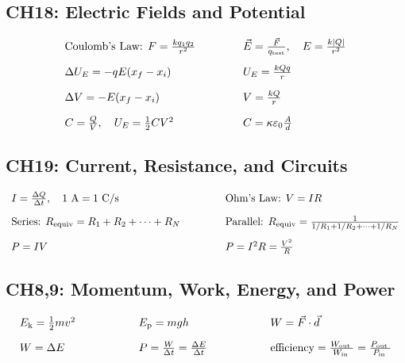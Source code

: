 \documentclass[12pt,a4paper]{article}
\begin{document}
\subsection{CH18: Electric Fields and Potential}
\begin{align*}
\begin{array}{l@{\hspace{1.5cm}}l}
\text{Coulomb's Law: } F = \frac{k q_1 q_2}{r^2} & \vec{E} = \frac{\vec{F}}{q_{\text{test}}}, \quad E = \frac{k|Q|}{r^2} \\[1em]
\Delta U_E = -qE(x_f - x_i) & U_E = \frac{kQq}{r} \\[1em]
\Delta V = -E(x_f - x_i) & V = \frac{kQ}{r} \\[1em]
C = \frac{Q}{V}, \quad U_E = \frac{1}{2}CV^2 & C = \kappa\varepsilon_0\frac{A}{d}
\end{array}
\end{align*}

\subsection{CH19: Current, Resistance, and Circuits}
\begin{align*}
\begin{array}{l@{\hspace{1.5cm}}l}
I = \frac{\Delta Q}{\Delta t}, \quad \text{1 A} = \text{1 C/s} & \text{Ohm's Law: } V = IR \\[1em]
\text{Series: } R_{\text{equiv}} = R_1 + R_2 + \cdots + R_N & \text{Parallel: } R_{\text{equiv}} = \frac{1}{1/R_1 + 1/R_2 + \cdots + 1/R_N} \\[1em]
P = IV & P = I^2R = \frac{V^2}{R}
\end{array}
\end{align*}



\iffalse

\subsection{CH8,9: Momentum, Work, Energy, and Power}
\begin{align*}
\begin{array}{l@{\hspace{2cm}}l@{\hspace{2cm}}l}
E_{\mathrm{k}}=\frac{1}{2} m v^{2} & E_{\mathrm{p}}=m g h & W=\vec{F} \cdot \vec{d} \\[1em]
W=\Delta E & P=\frac{W}{\Delta t}=\frac{\Delta E}{\Delta t} & \text{efficiency}=\frac{W_{\text {out }}}{W_{\text {in }}}=\frac{P_{\text {out }}}{P_{\text {in }}}
\end{array}
\end{align*}
\end{document}
